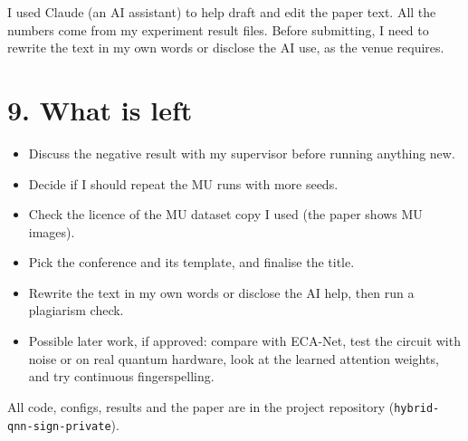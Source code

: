\documentclass[11pt,a4paper]{article}
\begin{document}
I used Claude (an AI assistant) to help draft and edit the paper text. All
the numbers come from my experiment result files. Before submitting, I need
to rewrite the text in my own words or disclose the AI use, as the venue
requires.

\section*{9. What is left}

\begin{itemize}
  \item Discuss the negative result with my supervisor before running
        anything new.
  \item Decide if I should repeat the MU runs with more seeds.
  \item Check the licence of the MU dataset copy I used (the paper shows MU
        images).
  \item Pick the conference and its template, and finalise the title.
  \item Rewrite the text in my own words or disclose the AI help, then run a
        plagiarism check.
  \item Possible later work, if approved: compare with ECA-Net, test the
        circuit with noise or on real quantum hardware, look at the learned
        attention weights, and try continuous fingerspelling.
\end{itemize}

All code, configs, results and the paper are in the project repository
(\texttt{hybrid-qnn-sign-private}).
\end{document}
